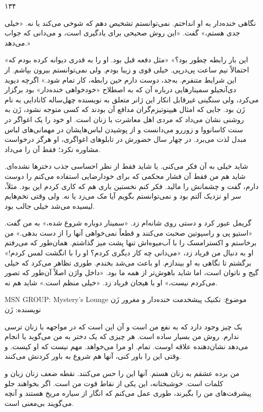 ۱۳۴

نگاهی خنده‌دار به او انداختم. نمی‌توانستم تشخیص دهم که شوخی می‌کند یا نه.  
«خیلی جدی هستم،» گفت. «این روش صحیحی برای یادگیری است، و می‌دانی که جواب می‌دهد.»

«این بار رابطه چطور بود؟»  
«مثل دفعه قبل بود. او را به قدری دیوانه کرده بودم که احتمالاً نیم ساعت پی‌درپی. خیلی قوی و زیبا بودم. ولی نمی‌توانستم بیرون بپاشم. از این شرایط متنفرم. به‌جد، دوست دارم حین رابطه، کار تمام شود.» اگرچه دیوید دی‌آنجیلو سمینارهایی درباره آن که به اصطلاح «خودخواهی خنده‌دار» بود برگزار می‌کرد، ولی سنگینی غیرقابل انکار این ژانر متعلق به نویسنده چهل‌ساله کانادایی به نام زَن بود. جایی که امثال هیپنوتیزم‌گران مدافع آن بودند که کسی متوجه نشود، زَن به روشنی نشان می‌داد که مردی اهل معاشرت با زنان است. او خود را یک اغواگر در سنت کاسانووا و زوررو می‌دانست و از پوشیدن لباس‌هایشان در مهمانی‌های لباس مبدل لذت می‌برد. در چهار سال حضورش در تابلوهای اغواگری، او هرگز درخواست مشاوره نکرد؛ فقط آن را می‌داد.

شاید خیلی به آن فکر می‌کنی. یا شاید فقط از نظر احساسی جذب دخترها نشده‌ای.  
شاید هم من فقط آن فشار محکمی که برای خودارضایی استفاده می‌کنم را دوست دارم، گفت و چشمانش را مالید. فکر کنم نخستین باری هم که کاری کردم این بود. مثلاً، سر او نزدیک آلتم بود و نمی‌توانستم بگویم آیا مک می‌زد یا نه. ولی وقتی تخم‌هایم لیسیده می‌شد خیلی جالب بود.

گریمل عبور کرد و دستی روی شانه‌ام زد. «سمینار دوباره شروع شده،» به من گفت. «استیو پی و راسپوتین صحبت می‌کنند و قطعاً نمی‌خواهی آنها را از دست بدهی.» من برخاستم و اکسترامسک را با آب‌میوه‌اش تنها پشت میز گذاشتم.  
همان‌طور که می‌رفتم او به دنبال من فریاد زد، «می‌دانی چه کار دیگری کردم؟ او را با انگشت لمس کردم!» برگشتم تا نگاهی به او بیندازم. او باعث می‌شد بخندم. طوری تظاهر می‌کرد که خیلی گیج و ناتوان است، اما شاید باهوش‌تر از همه ما بود.  
«داخل واژن اصلاً آن‌طور که تصور می‌کردم نیست،» او با هیجان فریاد زد. «خیلی منظم است.» شاید هم نه.

 MSN GROUP:  
 Mystery's Lounge  
موضوع: تکنیک پیشخدمت خنده‌دار و مغرور زَن  
نویسنده: زَن  

یک چیز وجود دارد که به نفع من است و آن این است که در مواجهه با زنان ترسی ندارم. روش من بسیار ساده است. هر چیزی که یک دختر به من می‌گوید یا انجام می‌دهد نشان‌دهنده علاقه اوست. تمام. او مرا می‌خواهد. مهم نیست که او کیست. و وقتی این را باور کنی، آنها هم شروع به باور کردنش می‌کنند.

من برده عشقم به زنان هستم. آنها این را حس می‌کنند. نقطه ضعف زنان زبان و کلمات است. خوشبختانه، این یکی از نقاط قوت من است. اگر بخواهند جلو پیشرفت‌های من را بگیرند، طوری عمل می‌کنم که انگار از سیاره مریخ هستند و آنچه می‌گویند بی‌معنی است.


